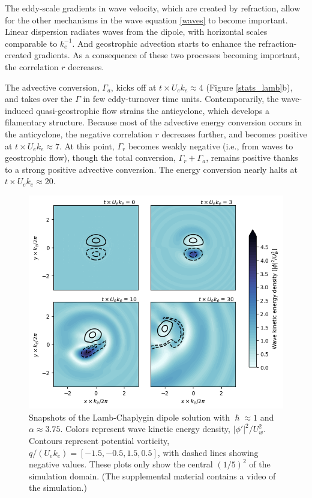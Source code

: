 \documentclass{jfm}
\begin{document}
The eddy-scale gradients in wave velocity, which are created by refraction,
 allow for the other mechanisms in the wave equation \eqref{waves} to become
 important. Linear dispersion radiates waves from the dipole, with horizontal
scales comparable to $k_e^{-1}$. And geostrophic advection starts to enhance
 the refraction-created gradients. As a consequence of these two processes becoming
 important, the correlation $r$ decreases.

The advective conversion, $\Gamma_a$, kicks
off at $t\times U_e k_e \approx 4$ (Figure \ref{stats_lamb}b), and takes over
the $\Gamma$ in few eddy-turnover time units. Contemporarily, the wave-induced
quasi-geostrophic flow strains the anticyclone, which develops a filamentary structure.
Because most of the advective energy conversion occurs in the anticyclone, the
negative correlation $r$ decreases further, and becomes positive at
$t\times U_e k_e \approx 7$. At this point, $\Gamma_r$ becomes weakly negative
(i.e., from waves to geostrophic flow), though the total conversion, $\Gamma_r
+ \Gamma_a$, remains positive thanks to a strong positive advective conversion.
The energy conversion nearly halts at $t\times U_e k_e \approx 20$.

\begin{figure}
\label{snaps_lamb}
\centering
\includegraphics[width=.925\textwidth]{figs/fig1.png}
\caption{Snapshots of the Lamb-Chaplygin dipole solution with $\hslash \approx 1$
        and $\alpha \approx 3.75$. Colors represent wave kinetic energy density,
         $|\phi'|^2/U_w^2$.
        Contours represent potential vorticity, $q / (U_e k_e) = [
        -1.5,-0.5,1.5,0.5]$, with dashed lines showing negative values.
        These plots only show the central $(1/5)^2$
        of the simulation domain. (The supplemental material contains a video
        of the simulation.)}
\end{figure}
\end{document}
